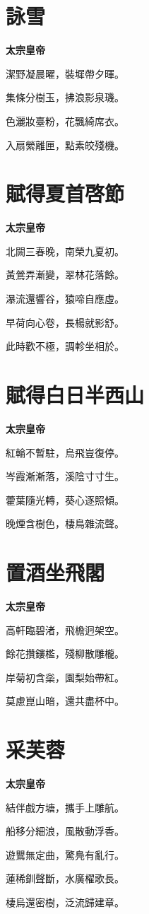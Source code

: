 \documentclass[12pt,a4paper]{ctexbook}
\begin{document}
\section{詠雪}
\textbf{太宗皇帝}\par\vspace{0.5em}
潔野凝晨曜，裝墀帶夕暉。\par
集條分樹玉，拂浪影泉璣。\par
色灑妝臺粉，花飄綺席衣。\par
入扇縈離匣，點素皎殘機。\par

\section{賦得夏首啓節}
\textbf{太宗皇帝}\par\vspace{0.5em}
北闕三春晚，南榮九夏初。\par
黃鶯弄漸變，翠林花落餘。\par
瀑流還響谷，猿啼自應虛。\par
早荷向心卷，長楊就影舒。\par
此時歡不極，調軫坐相於。\par

\section{賦得白日半西山}
\textbf{太宗皇帝}\par\vspace{0.5em}
紅輪不暫駐，烏飛豈復停。\par
岑霞漸漸落，溪陰寸寸生。\par
藿葉隨光轉，葵心逐照傾。\par
晚煙含樹色，棲鳥雜流聲。\par

\section{置酒坐飛閣}
\textbf{太宗皇帝}\par\vspace{0.5em}
高軒臨碧渚，飛檐迥架空。\par
餘花攢鏤檻，殘柳散雕櫳。\par
岸菊初含橤，園梨始帶紅。\par
莫慮崑山暗，還共盡杯中。\par

\section{采芙蓉}
\textbf{太宗皇帝}\par\vspace{0.5em}
結伴戲方塘，攜手上雕航。\par
船移分細浪，風散動浮香。\par
遊鸎無定曲，驚鳧有亂行。\par
蓮稀釧聲斷，水廣櫂歌長。\par
棲烏還密樹，泛流歸建章。\par
\end{document}
